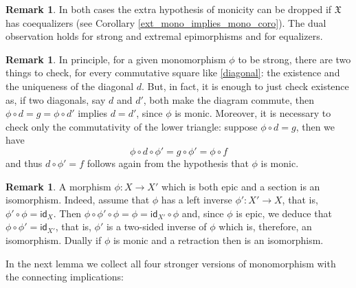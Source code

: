 \documentclass[12pt]{article}
\theoremstyle{definition}
\newtheorem{remark}[lemma]{Remark}
\def\X{\mathfrak X}
\numberwithin{equation}{section}
\newcommand{\id}[1]{\mathsf{id}_{#1}}
\begin{document}
\begin{remark}
In both cases the extra hypothesis of monicity can be dropped if $\X$ has coequalizers (see Corollary \ref{ext_mono_implies_mono_coro}). The dual observation holds for strong and extremal epimorphisms and for equalizers.
\end{remark}

\begin{remark}\label{mono:vs:unique:diagonal_1} 
In principle, for a given monomorphism $\phi$ to be strong, there are two things to check, for every commutative square like \eqref{diagonal}: the existence and the uniqueness of the diagonal $d$. But, in fact, it is enough to just check existence as, if two diagonals, say $d$ and $d'$, both make the diagram commute, then $\phi\circ d=g=\phi\circ d'$ implies $d=d'$, since $\phi$ is monic. Moreover, it is necessary to check only the commutativity of the lower triangle: suppose $\phi \circ d=g$, then we have
\[\phi \circ d \circ\phi'= g\circ \phi'= \phi \circ f\]
and thus $d\circ \phi' = f$ follows again from the hypothesis that $\phi$ is monic.
\end{remark}
\begin{remark} \label{mono:vs:unique:diagonal_2} 
 A morphism $\phi: X \to X'$ which is both epic and a section is an isomorphism. Indeed, assume that $\phi$ has a left inverse $\phi': X' \to X$, that is, $\phi' \circ \phi=\id {X}$. Then  $\phi\circ \phi' \circ \phi=\phi=\id {X'}\circ \phi$ and, since $\phi$ is epic, we deduce that $\phi\circ \phi'=\id {X'}$, that is, $\phi'$ is a two-sided inverse of $\phi$ which is, therefore, an isomorphism. Dually if $\phi$ is monic and a retraction then is an isomorphism.
\end{remark}



In the next lemma we collect all four stronger versions of monomorphism with the connecting implications:  
\end{document}
